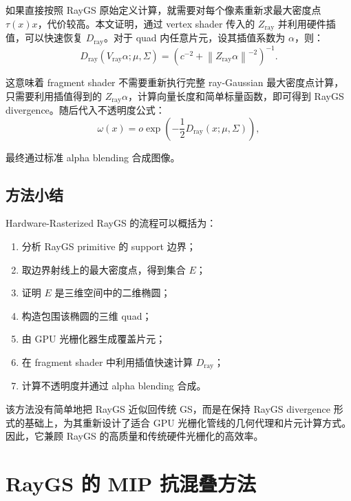 \documentclass[12pt,hyperref,a4paper,UTF8]{ctexart}
\begin{document}
如果直接按照 RayGS 原始定义计算，就需要对每个像素重新求最大密度点 $\tau(x)x$，代价较高。本文证明，通过 vertex shader 传入的 $Z_{\mathrm{ray}}$ 并利用硬件插值，可以快速恢复 $D_{\mathrm{ray}}$。对于 quad 内任意片元，设其插值系数为 $\alpha$，则：
\begin{equation}
\displaystyle
D_{\mathrm{ray}}(V_{\mathrm{ray}}\alpha;\mu,\Sigma)
=
\left(
c^{-2}
+
\left\|Z_{\mathrm{ray}}\alpha\right\|^{-2}
\right)^{-1}.
\end{equation}

这意味着 fragment shader 不需要重新执行完整 ray-Gaussian 最大密度点计算，只需要利用插值得到的 $Z_{\mathrm{ray}}\alpha$，计算向量长度和简单标量函数，即可得到 RayGS divergence。随后代入不透明度公式：
\begin{equation}
\displaystyle
\omega(x)
=
o\exp\!\left(
-\frac{1}{2}D_{\mathrm{ray}}(x;\mu,\Sigma)
\right),
\end{equation}

最终通过标准 alpha blending 合成图像。



\subsection{方法小结}
Hardware-Rasterized RayGS 的流程可以概括为：

\begin{enumerate}
    \item 分析 RayGS primitive 的 support 边界；
    \item 取边界射线上的最大密度点，得到集合 $E$；
    \item 证明 $E$ 是三维空间中的二维椭圆；
    \item 构造包围该椭圆的三维 quad；
    \item 由 GPU 光栅化器生成覆盖片元；
    \item 在 fragment shader 中利用插值快速计算 $D_{\mathrm{ray}}$；
    \item 计算不透明度并通过 alpha blending 合成。
\end{enumerate}

该方法没有简单地把 RayGS 近似回传统 GS，而是在保持 RayGS divergence 形式的基础上，为其重新设计了适合 GPU 光栅化管线的几何代理和片元计算方式。因此，它兼顾 RayGS 的高质量和传统硬件光栅化的高效率。



\section{RayGS 的 MIP 抗混叠方法}
\end{document}
